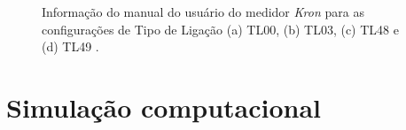 \documentclass[a4paper,12pt,oneside,openany,table,xcdraw]{article}
\begin{document}
\vspace{0.15cm}
\begin{figure}[H]
\centering
{}\hfill

\hfill


\caption{Informação do manual do usuário do medidor \emph{Kron} para as configurações de Tipo de Ligação (a) TL00, (b) TL03, (c) TL48 e (d) TL49 \cite{Kron}.}
\label{conf:kron}
\end{figure}
\vspace{0.2cm}


\newpage
\section{Simulação computacional} %
\end{document}
